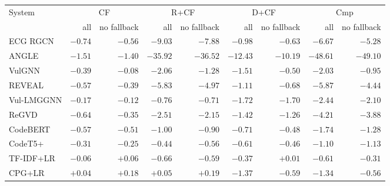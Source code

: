 \begin{tabular}{lrrrrrrrr}
\toprule
System & \multicolumn{2}{c}{CF} & \multicolumn{2}{c}{R+CF} & \multicolumn{2}{c}{D+CF} & \multicolumn{2}{c}{Cmp} \\
 & all & no fallback & all & no fallback & all & no fallback & all & no fallback \\
\midrule
ECG RGCN & $-0.74$ & $-0.56$ & $\mathbf{-9.03}$ & $\mathbf{-7.88}$ & $\mathbf{-0.98}$ & $-0.63$ & $\mathbf{-6.67}$ & $\mathbf{-5.28}$ \\
ANGLE & $-1.51$ & $-1.40$ & $\mathbf{-35.92}$ & $\mathbf{-36.52}$ & $-12.43$ & $-10.19$ & $\mathbf{-48.61}$ & $\mathbf{-49.10}$ \\
VulGNN & $-0.39$ & $-0.08$ & $\mathbf{-2.06}$ & $\mathbf{-1.28}$ & $\mathbf{-1.51}$ & $-0.50$ & $\mathbf{-2.03}$ & $\mathbf{-0.95}$ \\
REVEAL & $\mathbf{-0.57}$ & $\mathbf{-0.39}$ & $\mathbf{-5.83}$ & $\mathbf{-4.97}$ & $\mathbf{-1.11}$ & $\mathbf{-0.68}$ & $\mathbf{-5.87}$ & $\mathbf{-4.44}$ \\
Vul-LMGGNN & $-0.17$ & $\mathbf{-0.12}$ & $\mathbf{-0.76}$ & $\mathbf{-0.71}$ & $\mathbf{-1.72}$ & $\mathbf{-1.70}$ & $\mathbf{-2.44}$ & $\mathbf{-2.10}$ \\
ReGVD & $\mathbf{-0.64}$ & $\mathbf{-0.35}$ & $\mathbf{-2.51}$ & $\mathbf{-2.15}$ & $\mathbf{-1.42}$ & $\mathbf{-1.26}$ & $\mathbf{-4.21}$ & $\mathbf{-3.88}$ \\
CodeBERT & $\mathbf{-0.57}$ & $\mathbf{-0.51}$ & $\mathbf{-1.00}$ & $\mathbf{-0.90}$ & $\mathbf{-0.71}$ & $\mathbf{-0.48}$ & $\mathbf{-1.74}$ & $\mathbf{-1.28}$ \\
CodeT5+ & $-0.31$ & $-0.25$ & $\mathbf{-0.44}$ & $\mathbf{-0.56}$ & $-0.61$ & $-0.46$ & $\mathbf{-1.10}$ & $\mathbf{-1.13}$ \\
TF-IDF+LR & $-0.06$ & $+0.06$ & $-0.66$ & $-0.59$ & $-0.37$ & $+0.01$ & $-0.61$ & $-0.31$ \\
CPG+LR & $+0.04$ & $+0.18$ & $+0.05$ & $+0.19$ & $\mathbf{-1.37}$ & $\mathbf{-0.59}$ & $\mathbf{-1.34}$ & $\mathbf{-0.56}$ \\
\bottomrule
\end{tabular}
